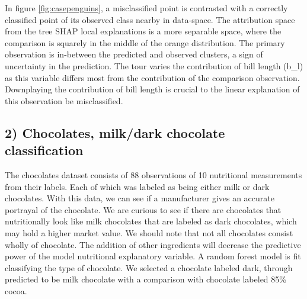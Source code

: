 \documentclass[
  article]{article}
\begin{document}
In figure \ref{fig:casepenguins}, a misclassified point is contrasted with a correctly classified point of its observed class nearby in data-space. The attribution space from the tree SHAP local explanations is a more separable space, where the comparison is squarely in the middle of the orange distribution. The primary observation is in-between the predicted and observed clusters, a sign of uncertainty in the prediction. The tour varies the contribution of bill length (b\_l) as this variable differs most from the contribution of the comparison observation. Downplaying the contribution of bill length is crucial to the linear explanation of this observation be misclassified.

\hypertarget{chocolates-milkdark-chocolate-classification}{%
\subsection{2) Chocolates, milk/dark chocolate classification}\label{chocolates-milkdark-chocolate-classification}}

The chocolates dataset consists of 88 observations of 10 nutritional measurements from their labels. Each of which was labeled as being either milk or dark chocolates. With this data, we can see if a manufacturer gives an accurate portrayal of the chocolate. We are curious to see if there are chocolates that nutritionally look like milk chocolates that are labeled as dark chocolates, which may hold a higher market value. We should note that not all chocolates consist wholly of chocolate. The addition of other ingredients will decrease the predictive power of the model nutritional explanatory variable. A random forest model is fit classifying the type of chocolate. We selected a chocolate labeled dark, through predicted to be milk chocolate with a comparison with chocolate labeled 85\% cocoa.
\end{document}
